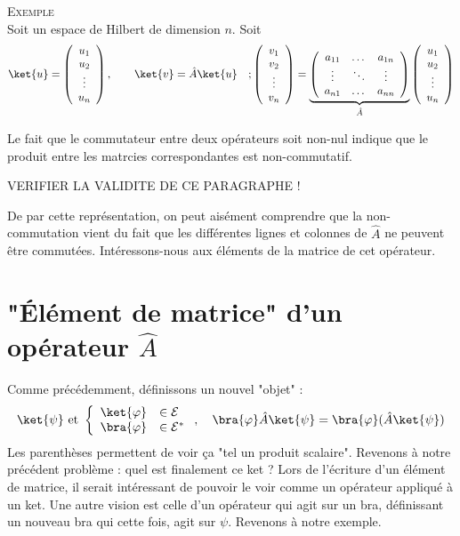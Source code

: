 \textsc{Exemple}\\
Soit un espace de Hilbert de dimension $n$. Soit
\begin{equation}
\ket{u} = \left(\begin{array}{c}
u_1\\
u_2\\
\vdots\\
u_n
\end{array}\right),\qquad \ket{v} = \hat{A}\ket{u}\quad ; \left(\begin{array}{c}
v_1\\
v_2\\
\vdots\\
v_n
\end{array}\right) = \underbrace{\left(\begin{array}{ccc}
a_{11} & \dots & a_{1n}\\
\vdots &\ddots &\vdots\\
a_{n1} & \dots & a_{nn}
\end{array}\right)}_{\hat{A}}\left(\begin{array}{c}
u_1\\
u_2\\
\vdots\\
u_n
\end{array}\right)
\end{equation}

Le fait que le commutateur entre deux opérateurs soit non-nul indique que le
produit entre les matrcies correspondantes est non-commutatif.

VERIFIER LA VALIDITE DE CE PARAGRAPHE !

De par cette représentation, on peut aisément comprendre que la non-commutation 
vient du fait que les différentes lignes et colonnes de $\hat{A}$ ne peuvent 
être commutées. Intéressons-nous aux éléments de la matrice de cet opérateur.



\section{"Élément de matrice" d'un opérateur $\hat{A}$}
Comme précédemment, définissons un nouvel "objet" :
\begin{equation}
\ket{\psi} \text{ et } \left\{\begin{array}{ll}
\ket{\varphi} &\in \mathcal{E}\\
\bra{\varphi} &\in \mathcal{E}^*
\end{array}\right., \quad \bra{\varphi}\hat{A}\ket{\psi} = \bra{\varphi}(
\hat{A}\ket{\psi})
\end{equation}
Les parenthèses permettent de voir ça "tel un produit scalaire". Revenons 
à notre précédent problème : quel est finalement ce ket ? Lors de l'écriture 
d'un élément de matrice, il serait intéressant de pouvoir le voir comme un 
opérateur appliqué à un ket. Une autre vision est celle d'un opérateur 
qui agit sur un bra, définissant un nouveau bra qui cette fois, agit sur 
$\psi$. Revenons à notre exemple.

